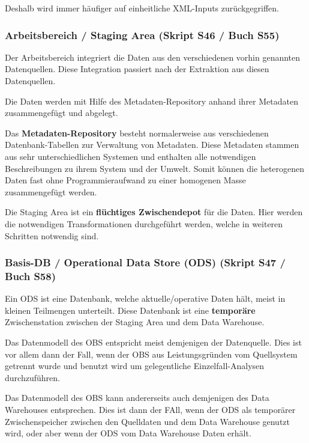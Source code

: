 \documentclass[a4paper, 11pt, nofootinbib]{article}
\begin{document}
Deshalb wird immer häufiger auf einheitliche XML-Inputs zurückgegriffen.

\subsubsection{Arbeitsbereich / Staging Area (Skript S46 / Buch S55)}
Der Arbeitsbereich integriert die Daten aus den verschiedenen vorhin genannten Datenquellen. Diese Integration passiert nach der Extraktion aus diesen Datenquellen.

Die Daten werden mit Hilfe des Metadaten-Repository anhand ihrer Metadaten zusammengefügt und abgelegt.

Das \textbf{Metadaten-Repository} besteht normalerweise aus verschiedenen Datenbank-Tabellen zur Verwaltung von Metadaten. Diese Metadaten stammen aus sehr unterschiedlichen Systemen und enthalten alle notwendigen Beschreibungen zu ihrem System und der Umwelt. Somit können die heterogenen Daten fast ohne Programmieraufwand zu einer homogenen Masse zusammengefügt werden.

\vspace{10px}

\noindent Die Staging Area ist ein \textbf{flüchtiges Zwischendepot} für die Daten. Hier werden die notwendigen Transformationen durchgeführt werden, welche in weiteren Schritten notwendig sind.

\subsubsection{Basis-DB / Operational Data Store (ODS) (Skript S47 / Buch S58)}
Ein ODS ist eine Datenbank, welche aktuelle/operative Daten hält, meist in kleinen Teilmengen unterteilt. Diese Datenbank ist eine \textbf{temporäre} Zwischenstation zwischen der Staging Area und dem Data Warehouse. 

\vspace{10px}

\noindent Das Datenmodell des OBS entspricht meist demjenigen der Datenquelle. Dies ist vor allem dann der Fall, wenn der OBS aus Leistungsgründen vom Quellsystem getrennt wurde und benutzt wird um gelegentliche Einzelfall-Analysen durchzuführen.

\vspace{10px}

\noindent Das Datenmodell des OBS kann andererseits auch demjenigen des Data Warehouses entsprechen. Dies ist dann der FAll, wenn der ODS als temporärer Zwischenspeicher zwischen den Quelldaten und dem Data Warehouse genutzt wird, oder aber wenn der ODS vom Data Warehouse Daten erhält.
\end{document}
